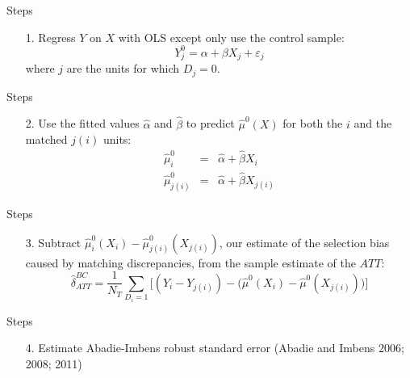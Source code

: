 \documentclass{beamer}
\begin{document}
\begin{frame}{Steps}

\begin{enumerate}
\item[1.  ]Regress $Y$ on $X$ with OLS except only use the control sample:
\begin{equation}
Y^0_j = \alpha + \beta X_j + \varepsilon_j \nonumber
\end{equation}where $j$ are the units for which $D_j=0$.  
\end{enumerate}

\end{frame}

\begin{frame}{Steps}

\begin{enumerate}
\item[2. ] Use the fitted values $\widehat{\alpha}$ and $\widehat{\beta}$ to predict $\widehat{\mu}^0(X)$ for both the $i$ and the matched $j(i)$ units:
\begin{eqnarray}
\widehat{\mu}^0_i &=& \widehat{\alpha} + \widehat{\beta} X_i \nonumber \\
\widehat{\mu}^0_{j(i)} &=& \widehat{\alpha} + \widehat{\beta} X_{j(i)} \nonumber
\end{eqnarray}
\end{enumerate}

\end{frame}


\begin{frame}{Steps}

\begin{enumerate}
\item[3. ] Subtract $ \widehat{\mu}_i^0(X_i) - \widehat{\mu}_{j(i)}^0(X_{j(i)})$, our estimate of the selection bias caused by matching discrepancies, from the sample estimate of the $ATT$: $$\widehat{\delta}_{ATT}^{BC} = \dfrac{1}{N_T} \sum_{D_i=1} \bigg [ (Y_i - Y_{j(i)}) - \Big(\widehat{\mu}^0(X_i) - \widehat{\mu}^0(X_{j(i)})\Big) \bigg ]$$
\end{enumerate}

\end{frame}


\begin{frame}{Steps}

\begin{enumerate}
\item[4. ] Estimate Abadie-Imbens robust standard error (Abadie and Imbens 2006; 2008; 2011)
\end{enumerate}

\end{frame}
\end{document}
